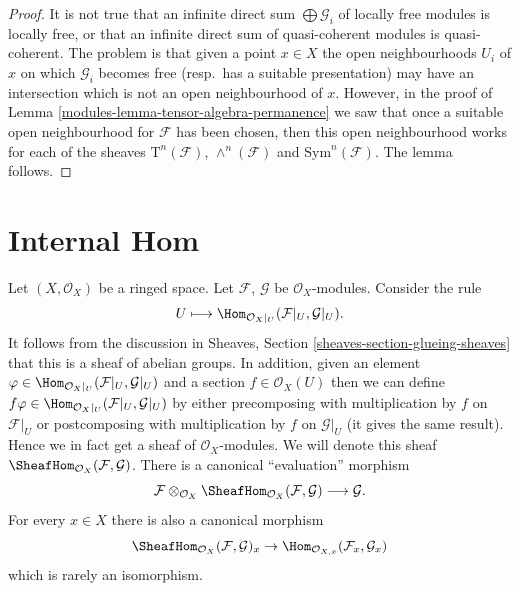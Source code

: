 \begin{proof}

It is not true that an infinite direct sum $\bigoplus \mathcal{G}_i$ of
locally free modules is locally free, or that an
infinite direct sum of quasi-coherent modules
is quasi-coherent. The problem is that given a
point $x \in X$ the open neighbourhoods $U_i$ of $x$ on which $\mathcal{G}_i$
becomes free (resp.\ has a suitable presentation) may have an intersection
which is not an open neighbourhood of $x$. However, in the
proof of Lemma \ref{modules-lemma-tensor-algebra-permanence} we saw that
once a suitable open neighbourhood for $\mathcal{F}$ has been chosen,
then this open neighbourhood works for each of the sheaves
$\text{T}^n(\mathcal{F})$, $\wedge^n(\mathcal{F})$ and
$\text{Sym}^n(\mathcal{F})$.
The lemma follows.
\end{proof}

\section{Internal Hom}
\label{modules-section-internal-hom}
Let $(X, \mathcal{O}_X)$ be a ringed space.
Let $\mathcal{F}$, $\mathcal{G}$ be $\mathcal{O}_X$-modules.
Consider the rule
$$
U \longmapsto \Hom_{\mathcal{O}_X|_U}(\mathcal{F}|_U, \mathcal{G}|_U).
$$
It follows from the discussion in Sheaves, Section
\ref{sheaves-section-glueing-sheaves} that this is a sheaf of
abelian groups. In addition, given an element
$\varphi \in \Hom_{\mathcal{O}_X|_U}(\mathcal{F}|_U, \mathcal{G}|_U)$
and a section $f \in \mathcal{O}_X(U)$ then we can define
$f\varphi \in \Hom_{\mathcal{O}_X|_U}(\mathcal{F}|_U, \mathcal{G}|_U)$
by either precomposing with multiplication by $f$ on $\mathcal{F}|_U$
or postcomposing with multiplication by $f$ on $\mathcal{G}|_U$ (it gives
the same result). Hence we in fact get a sheaf of $\mathcal{O}_X$-modules.
We will denote this sheaf
$\SheafHom_{\mathcal{O}_X}(\mathcal{F}, \mathcal{G})$.
There is a canonical ``evaluation'' morphism
$$
\mathcal{F}
\otimes_{\mathcal{O}_X}
\SheafHom_{\mathcal{O}_X}(\mathcal{F}, \mathcal{G})
\longrightarrow
\mathcal{G}.
$$
For every $x \in X$ there is also a canonical morphism
$$
\SheafHom_{\mathcal{O}_X}(\mathcal{F}, \mathcal{G})_x
\to
\Hom_{\mathcal{O}_{X, x}}(\mathcal{F}_x, \mathcal{G}_x)
$$
which is rarely an isomorphism.


